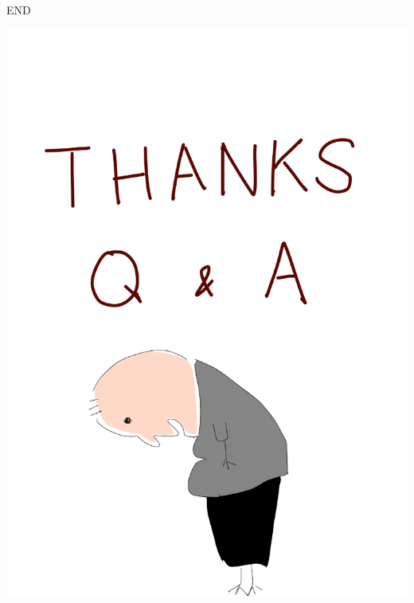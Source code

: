 \documentclass{beamer}
\begin{document}
\begin{frame}{END}
\begin{center}
    \includegraphics[height=0.8\textheight]{thanks.pdf}
\end{center}
\end{frame}
\end{document}
